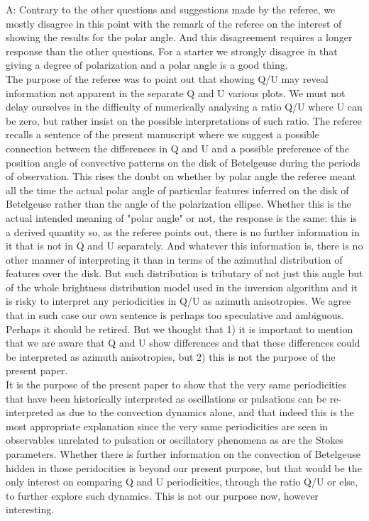 \documentclass{article}
\begin{document}
A: Contrary to the other questions and suggestions made by the referee, we mostly disagree in this point with the remark of the referee on the interest of showing the results for the polar angle. And this disagreement requires a longer response than the other questions.
For a starter we strongly disagree in that giving a degree of polarization and a polar angle is a good thing.\\
The purpose of the referee was to point out that showing Q/U  may reveal information not apparent in the separate Q and U various plots. We must not delay ourselves in the difficulty of numerically analysing a ratio Q/U where U can be zero, but rather insist on the possible interpretations of such ratio. The referee recalls a sentence of the present manuscript where we suggest a possible connection between the differences in Q and U and a possible preference of the position angle of convective patterns on the disk of Betelgeuse during the periods of observation. This rises the doubt on whether by polar angle the referee meant all the time the actual polar angle of particular features inferred on the disk of Betelgeuse rather than the angle of the polarization ellipse. Whether this is the actual intended meaning of "polar angle" or not, the response is the same: this is a derived quantity so, as the referee points out, there is no further information in it that is not in Q and U separately. And whatever this information is, there is no other manner of interpreting it than in terms of the azimuthal distribution of features over the disk. But such distribution is tributary of not just this angle but of the whole brightness distribution model used in the inversion algorithm and it is risky to interpret any periodicities in Q/U as azimuth anisotropies. We agree that in such case our own sentence is perhaps too speculative and ambiguous. Perhaps it should be retired. But we thought that 1) it is important to mention that we are aware that Q and U show differences and that these differences could be interpreted as azimuth anisotropies, but 2) this is not the purpose of the present paper.\\
It is the purpose of the present paper to show that the very same periodicities that have been historically interpreted as oscillations or pulsations can be re-interpreted as due to the convection dynamics alone, and that indeed this is the most appropriate explanation since the very same periodicities are seen in observables unrelated to pulsation or oscillatory phenomena as are the Stokes parameters. Whether there is further information on the convection of Betelgeuse hidden in those peridocities is beyond our present purpose, but that would be the only interest on comparing Q and U periodicities, through the ratio Q/U or else, to further explore such dynamics. This is not our purpose now, however interesting.\\
\end{document}
